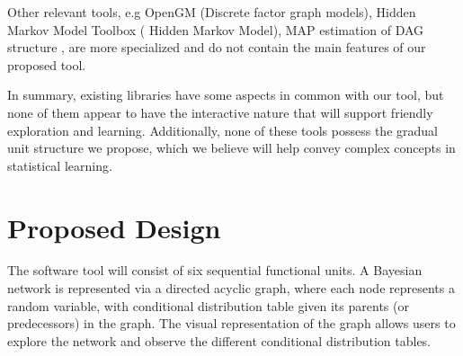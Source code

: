 \documentclass{article}
\newcommand{\comment}[2]{
	\todo[color=GreenYellow,inline]{
		\underline{\textbf{#1:}} #2
	}}
\begin{document}
\begin{enumerate}
    \end{enumerate}

    Other relevant tools, e.g OpenGM \cite{OpenGM} (Discrete factor graph models), Hidden Markov Model Toolbox \cite{Hidden Markov Model Toolbox} ( Hidden Markov Model), MAP estimation of DAG structure \cite{MAPEstimation}, are more specialized and do not contain the main features of our proposed tool.
 
    In summary, existing libraries have some aspects in common with our tool, but none of them appear to have the interactive nature that will support friendly exploration and learning. Additionally, none of these tools possess the gradual unit structure we propose, which we believe will help convey complex concepts in statistical learning.
    
    
    \section{Proposed Design}\label{sec:design}
    The software tool will consist of six sequential functional units. A Bayesian network is represented via a directed acyclic graph, where each node represents a random variable, with conditional distribution table given its parents (or predecessors) in the graph. The visual representation of the graph allows users to explore the network and observe the different conditional distribution tables.
    
\end{document}
